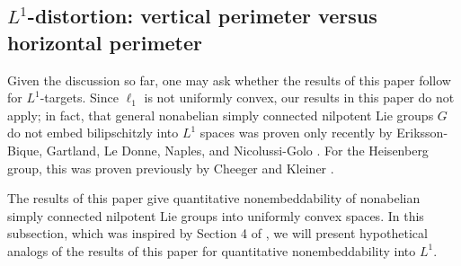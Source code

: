 \documentclass[11pt,reqno]{amsart}
\newcommand{\1}{\mathbf 1}
\begin{document}












\subsection{$L^1$-distortion: vertical perimeter versus horizontal perimeter}\label{subsec:l1}
Given the discussion so far, one may ask whether the results of this paper follow for $L^1$-targets. Since $\ell_1$ is not uniformly convex, our results in this paper do not apply; in fact, that general nonabelian simply connected nilpotent Lie groups $G$ do not embed bilipschitzly into $L^1$ spaces was proven only recently by Eriksson-Bique, Gartland, Le Donne, Naples, and Nicolussi-Golo \cite{eriksson2023nilpotent}. For the Heisenberg group, this was proven previously by Cheeger and Kleiner \cite{cheeger2010differentiating}.

The results of this paper give quantitative nonembeddability of nonabelian simply connected nilpotent Lie groups into uniformly convex spaces. In this subsection, which was inspired by Section 4 of \cite{lafforgue2014vertical}, we will present hypothetical analogs of the results of this paper for quantitative nonembeddability into $L^1$.
\end{document}
